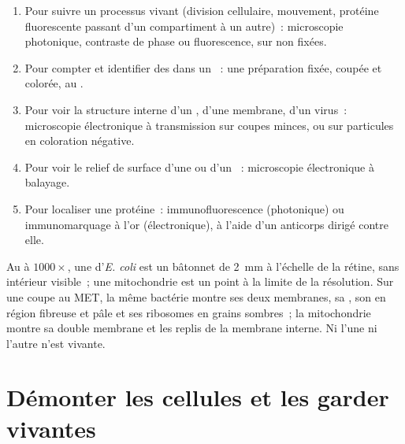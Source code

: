\begin{method}\label{met:b1:cell-unit-of-life:choose}
\begin{enumerate}
  \item Pour suivre un processus vivant (division cellulaire,
        mouvement, protéine fluorescente passant d'un compartiment à un
        autre)~: microscopie photonique, contraste de phase ou
        fluorescence, sur  non fixées.
  \item Pour compter et identifier des  dans un ~: une
        préparation fixée, coupée et colorée, au .
  \item Pour voir la structure interne d'un , d'une membrane,
        d'un virus~: microscopie électronique à transmission sur coupes
        minces, ou sur particules en coloration négative.
  \item Pour voir le relief de surface d'une  ou d'un ~:
        microscopie électronique à balayage.
  \item Pour localiser une protéine~: immunofluorescence (photonique) ou
        immunomarquage à l'or (électronique), à l'aide d'un anticorps
        dirigé contre elle.
\end{enumerate}
\end{method}

\begin{example}\label{ex:b1:cell-unit-of-life:seeing}
Au  à $1000\times$, une  d'\emph{E. coli}
est un bâtonnet de \qty{2}{mm} à l'échelle de la rétine, sans intérieur
visible~; une mitochondrie est un point à la limite de la résolution.
Sur une coupe au MET, la même bactérie montre ses deux membranes, sa
, son  en région fibreuse et pâle et ses ribosomes en
grains sombres~; la mitochondrie montre sa double membrane et les
replis de la membrane interne. Ni l'une ni l'autre n'est vivante.
\end{example}

\section{Démonter les cellules et les garder vivantes}

